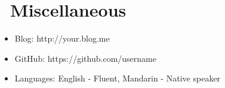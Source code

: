 \documentclass{resume}
\begin{document}

\section{\faInfo\ Miscellaneous}
\begin{itemize}[parsep=0.5ex]
  \item Blog: http://your.blog.me
  \item GitHub: https://github.com/username
  \item Languages: English - Fluent, Mandarin - Native speaker
\end{itemize}

%
%
\end{document}
